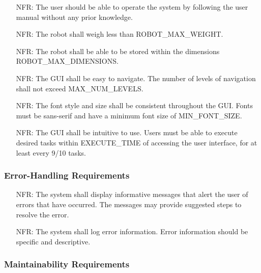 \documentclass[12pt]{article}
\newcounter{nfrnum} %
\begin{document}
\noindent \begin{itemize}
\item[NFR\refstepcounter{nfrnum}\thenfrnum \label{NFR_Usability1}:] The user should be able to operate the system by following the user manual without any prior knowledge.
\item[NFR\refstepcounter{nfrnum}\thenfrnum \label{NFR_Usability2}:] The robot shall weigh less than ROBOT\_MAX\_WEIGHT.
\item[NFR\refstepcounter{nfrnum}\thenfrnum \label{NFR_Usability3}:] The robot shall be able to be stored within the dimensions ROBOT\_MAX\_DIMENSIONS.
\item[NFR\refstepcounter{nfrnum}\thenfrnum \label{NFR_Usability4}:] The GUI shall be easy to navigate. The number of levels of navigation shall not exceed MAX\_NUM\_LEVELS.
\item[NFR\refstepcounter{nfrnum}\thenfrnum \label{NFR_Usability5}:] The font style and size shall be consistent throughout the GUI. Fonts must be sans-serif and have a minimum font size of MIN\_FONT\_SIZE.
\item[NFR\refstepcounter{nfrnum}\thenfrnum \label{NFR_Usability6}:] The GUI shall be intuitive to use. Users must be able to execute desired tasks within EXECUTE\_TIME of accessing the user interface, for at least every 9/10 tasks.
\end{itemize}

\subsubsection{Error-Handling Requirements}
\noindent \begin{itemize}
\item[NFR\refstepcounter{nfrnum}\thenfrnum \label{NFR_Errors1}:] The system shall display informative messages that alert the user of errors that have occurred. The messages may provide suggested steps to resolve the error.
\item[NFR\refstepcounter{nfrnum}\thenfrnum \label{NFR_Errors2}:] The system shall log error information. Error information should be specific and descriptive.
\end{itemize}

\subsubsection{Maintainability Requirements}
\end{document}
